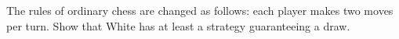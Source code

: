 The rules of ordinary chess are changed as follows: each player makes two moves per turn. Show that White has at least a strategy guaranteeing a draw.
